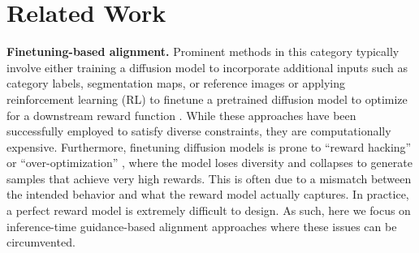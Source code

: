 \section{Related Work}
\vspace{-0.2cm}
\label{sec:lit}


\textbf{Finetuning-based alignment.} Prominent methods in this category typically involve either training a diffusion model to incorporate additional inputs such as category labels, segmentation maps, or reference images \citep{Ho2021Classifier-FreeGuidance,li2023gligen,Zhang2023AddingModels,bansal2024cold,mou2024t2i,Ruiz_2023} or applying reinforcement learning (RL) to finetune a pretrained diffusion model to optimize for a downstream reward function \citep{Prabhudesai2023AligningBackpropagation,Fan2023DPOK:Models,Wallace2023DiffusionOptimization,Black2023TrainingLearning,gu2024diffusionrpo,lee2024direct,uehara2024understanding}. While these approaches have been successfully employed to satisfy diverse constraints, they are computationally expensive. Furthermore, finetuning diffusion models is prone to ``reward hacking'' or ``over-optimization'' \citep{clark2024directly,jena2024elucidating}, where the model loses diversity and collapses to generate samples that achieve very high rewards. This is often due to a mismatch between the intended behavior and what the reward model actually captures. In practice, a perfect reward model is extremely difficult to design. As such, here we focus on inference-time guidance-based alignment approaches where these issues can be circumvented.  

